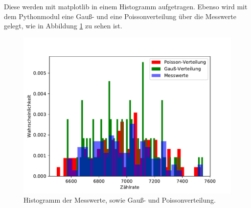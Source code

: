 Diese werden mit matplotlib in einem Histogramm aufgetragen. Ebenso wird mit dem Pythonmodul eine Gauß- und eine Poissonverteilung über die Messwerte gelegt, wie in Abbildung \ref{fig:histogramm} zu sehen ist.


\begin{figure}[h!]
	\centering
	\includegraphics[width=1\linewidth]{test3.pdf}
	\caption{Histogramm der Messwerte, sowie Gauß- und Poissonverteilung.}
	\label{fig:histogramm}
\end{figure}




